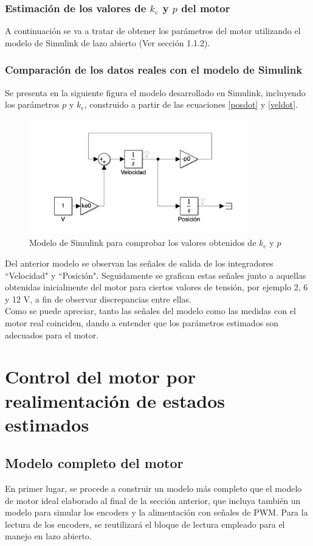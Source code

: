\documentclass[a4paper, 12pt]{article}
\begin{document}
\subsubsection{Estimación de los valores de $k_e$ y $p$ del motor}
A continuación se va a tratar de obtener los parámetros del motor utilizando el modelo de Simulink de lazo abierto (Ver sección 1.1.2). 

\subsubsection{Comparación de los datos reales con el modelo de Simulink}
Se presenta en la siguiente figura el modelo desarrollado en Simulink, incluyendo los parámetros $p$ y $k_e$, construido a partir de las ecuaciones \ref{posdot} y \ref{veldot}. 
\begin{figure}[h!]
	\centering
	\includegraphics[height=5cm]{figs/pykesimulink}
	\caption{Modelo de Simulink para comprobar los valores obtenidos de $k_e$ y $p$}
\end{figure}

Del anterior modelo se observan las señales de salida de los integradores ``Velocidad" y ``Posición".  
Seguidamente se grafican estas señales junto a aquellas obtenidas inicialmente del motor para ciertos valores de tensión, por ejemplo 2, 6 y 12 V, 
a fin de observar discrepancias entre ellas. \\

Como se puede apreciar, tanto las señales del modelo como las medidas con el motor real coinciden, dando a entender que los parámetros estimados son adecuados para el motor. 



\section{Control del motor por realimentación de estados estimados}
\subsection{Modelo completo del motor}
En primer lugar, se procede a construir un modelo más completo que el modelo de motor ideal elaborado al final de la sección anterior, que incluya también un modelo para simular los encoders y la alimentación con señales de PWM. 
Para la lectura de los encoders, se reutilizará el bloque de lectura empleado para el manejo en lazo abierto. \\
\end{document}
